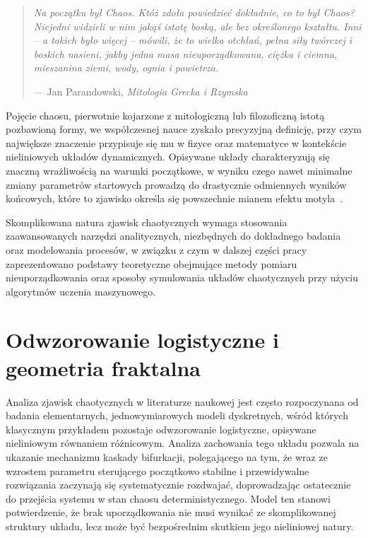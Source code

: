 \begin{quote}
\itshape
Na początku był Chaos. Któż zdoła powiedzieć dokładnie, 
co to był Chaos?  
Niejedni widzieli w nim jakąś istotę boską, ale bez określonego kształtu. 
Inni – a takich było więcej – mówili, że to wielka otchłań, pełna siły 
twórczej i boskich nasieni, jakby jedna masa nieuporządkowana, ciężka i ciemna, 
mieszanina ziemi, wody, ognia i powietrza.

\hfill--- Jan Parandowski, \textit{Mitologia Grecka i Rzymska}
\end{quote}
\vspace{1.5em}

Pojęcie chaosu, pierwotnie kojarzone z mitologiczną lub filozoficzną istotą pozbawioną formy, we współczesnej nauce zyskało precyzyjną definicję, przy czym największe znaczenie przypisuje się mu w fizyce oraz matematyce w kontekście nieliniowych układów dynamicznych. Opisywane układy charakteryzują się znaczną wrażliwością na warunki początkowe, w wyniku czego nawet minimalne zmiany parametrów startowych prowadzą do drastycznie odmiennych wyników końcowych, które to zjawisko określa się powszechnie mianem efektu motyla~\cite{motyl2}.
 
Skomplikowana natura zjawisk chaotycznych wymaga stosowania zaawansowanych narzędzi analitycznych, niezbędnych do dokładnego badania oraz modelowania procesów, w związku z czym w dalszej części pracy zaprezentowano podstawy teoretyczne obejmujące metody pomiaru nieuporządkowania oraz sposoby symulowania układów chaotycznych przy użyciu algorytmów uczenia maszynowego.
 
\section{Odwzorowanie logistyczne i geometria fraktalna}
 
Analiza zjawisk chaotycznych w literaturze naukowej jest często rozpoczynana od badania elementarnych, jednowymiarowych modeli dyskretnych, wśród których klasycznym przykładem pozostaje odwzorowanie logistyczne, opisywane nieliniowym równaniem różnicowym. Analiza zachowania tego układu pozwala na ukazanie mechanizmu kaskady bifurkacji, polegającego na tym, że wraz ze wzrostem parametru sterującego początkowo stabilne i przewidywalne rozwiązania zaczynają się systematycznie rozdwajać, doprowadzając ostatecznie do przejścia systemu w stan chaosu deterministycznego. Model ten stanowi potwierdzenie, że brak uporządkowania nie musi wynikać ze skomplikowanej struktury układu, lecz może być bezpośrednim skutkiem jego nieliniowej natury.
 
